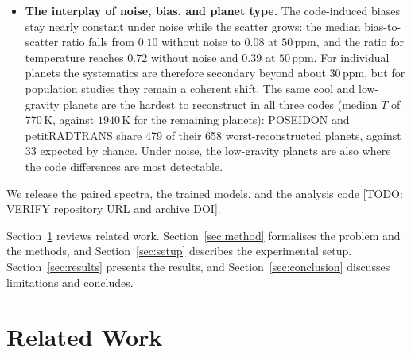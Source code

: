 \begin{itemize}
  \item \textbf{The interplay of noise, bias, and planet type.}
  The code-induced biases stay nearly constant under noise while the scatter grows: the median bias-to-scatter ratio falls from $0.10$ without noise to $0.08$ at $50\,\mathrm{ppm}$, and the ratio for temperature reaches $0.72$ without noise and $0.39$ at $50\,\mathrm{ppm}$.
  For individual planets the systematics are therefore secondary beyond about $30\,\mathrm{ppm}$, but for population studies they remain a coherent shift.
  The same cool and low-gravity planets are the hardest to reconstruct in all three codes (median $T$ of $770\,\mathrm{K}$, against $1940\,\mathrm{K}$ for the remaining planets): POSEIDON and petitRADTRANS share 479 of their 658 worst-reconstructed planets, against 33 expected by chance.
  Under noise, the low-gravity planets are also where the code differences are most detectable.
\end{itemize}
We release the paired spectra, the trained models, and the analysis code [TODO: VERIFY repository URL and archive DOI].

Section~\ref{sec:related} reviews related work.
Section~\ref{sec:method} formalises the problem and the methods, and Section~\ref{sec:setup} describes the experimental setup.
Section~\ref{sec:results} presents the results, and Section~\ref{sec:conclusion} discusses limitations and concludes.

\section{Related Work}
\label{sec:related}

